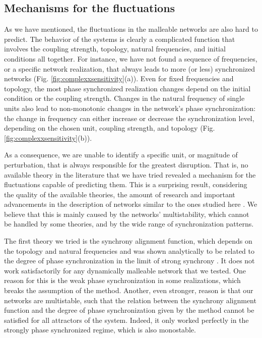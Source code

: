 \subsection*{Mechanisms for the fluctuations}
As we have mentioned, the fluctuations in the malleable networks are also hard to predict. The behavior of the systems is clearly a complicated function that involves the coupling strength, topology, natural frequencies, and initial conditions all together. For instance, we have not found a sequence of frequencies, or a specific network realization, that always leads to more (or less) synchronized networks (Fig. \ref{fig:complexxsensitivity}(a)). Even for fixed frequencies and topology, the most phase synchronized realization changes depend on the initial condition or the coupling strength. Changes in the natural frequency of single units also lead to non-monotonic changes in the network's phase synchronization: the change in frequency can either increase or decrease the synchronization level, depending on the chosen unit, coupling strength, and topology (Fig. \ref{fig:complexxsensitivity}(b)).

As a consequence, we are unable to identify a specific unit, or magnitude of perturbation, that is always responsible for the greatest disruption. That is, no available theory in the literature that we have tried revealed a mechanism for the fluctuations capable of predicting them. This is a surprising result, considering the quality of the available theories, the amount of research and important advancements in the description of networks similar to the ones studied here \cite{peter2018transition, skardal2014optimal, brede2008synchrony, carareto2009optimized}. We believe that this is mainly caused by the networks' multistability, which cannot be handled by some theories, and by the wide range of synchronization patterns. 

The first theory we tried is the synchrony alignment function, which depends on the topology and natural frequencies and was shown analytically to be related to the degree of phase synchronization in the limit of strong synchrony \cite{skardal2014optimal}. It does not work satisfactorily for any dynamically malleable network that we tested. One reason for this is the weak phase synchronization in some realizations, which breaks the assumption of the method. Another, even stronger, reason is that our networks are multistable, such that the relation between the synchrony alignment function and the degree of phase synchronization given by the method cannot be satisfied for all attractors of the system. Indeed, it only worked perfectly in the strongly phase synchronized regime, which is also monostable.

